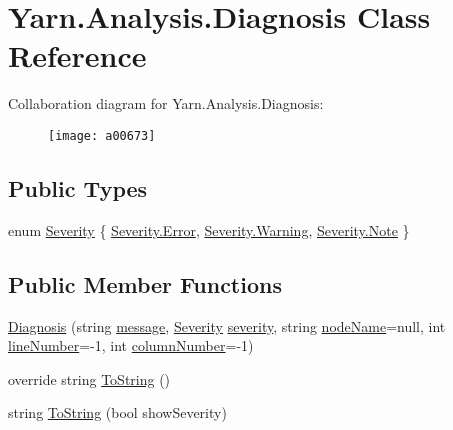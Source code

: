 \hypertarget{a00087}{\section{Yarn.\-Analysis.\-Diagnosis Class Reference}
\label{a00087}
}


Collaboration diagram for Yarn.\-Analysis.\-Diagnosis\-:
\nopagebreak
\begin{figure}[H]
\begin{center}
\leavevmode
\texttt{[image: a00673]}
\end{center}
\end{figure}
\subsection*{Public Types}
\begin{DoxyCompactItemize}
\item 
enum \hyperlink{a00087_a227813cbc8fa03c3448a612ffc909d1c}{Severity} \{ \hyperlink{a00087_a227813cbc8fa03c3448a612ffc909d1ca902b0d55fddef6f8d651fe1035b7d4bd}{Severity.\-Error}, 
\hyperlink{a00087_a227813cbc8fa03c3448a612ffc909d1ca0eaadb4fcb48a0a0ed7bc9868be9fbaa}{Severity.\-Warning}, 
\hyperlink{a00087_a227813cbc8fa03c3448a612ffc909d1ca3b0649c72650c313a357338dcdfb64ec}{Severity.\-Note}
 \}
\end{DoxyCompactItemize}
\subsection*{Public Member Functions}
\begin{DoxyCompactItemize}
\item 
\hyperlink{a00087_ad3fd818f1be98dc803e5bec959153824}{Diagnosis} (string \hyperlink{a00087_ac7ed070dddd2613c08e7874ea5afb3af}{message}, \hyperlink{a00087_a227813cbc8fa03c3448a612ffc909d1c}{Severity} \hyperlink{a00087_ad90ffa839ce0f568a099bb37b4a6c4da}{severity}, string \hyperlink{a00087_a662aca4ad2af5116c2cf6773daf1a847}{node\-Name}=null, int \hyperlink{a00087_a0bd73f1c684bfd66ae7b6bef8f2972d0}{line\-Number}=-\/1, int \hyperlink{a00087_a658e7fb05555c0f9ab5f80057bdc1408}{column\-Number}=-\/1)
\item 
override string \hyperlink{a00087_a4475eb5890c340da5c0012e25c2c86ae}{To\-String} ()
\item 
string \hyperlink{a00087_a985dee7ca27aa896332590133606b6a9}{To\-String} (bool show\-Severity)
\end{DoxyCompactItemize}
